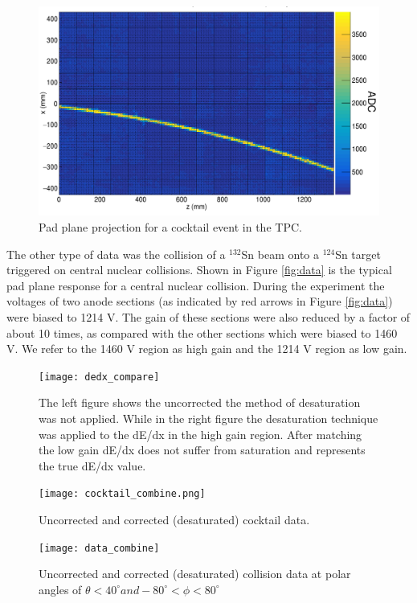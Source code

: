 \documentclass[review]{elsarticle}
\begin{document}
\begin{figure}[H]
\includegraphics[width=\linewidth]{cocktail.png}
\caption{Pad plane projection for a cocktail event in the TPC.}
\label{fig:cocktail}
\end{figure}

The other type of data was the collision of a ${}^{132}$Sn beam onto a ${}^{124}$Sn target triggered on central nuclear collisions. Shown in Figure \ref{fig:data} is the typical pad plane response for a central nuclear collision. During the experiment the voltages of two anode sections (as indicated by red arrows in Figure \ref{fig:data}) were biased to 1214 V. The gain of these sections were also reduced by a factor of about 10 times, as compared with the other sections which were biased to 1460 V. We refer to the 1460 V region as high gain and the 1214 V region as low gain. 

\begin{figure}[t]
\centering
\texttt{[image: dedx\_compare]}
\caption{The left figure shows the uncorrected the method of desaturation was not applied. While in the right figure the desaturation technique was applied to the dE/dx in the high gain region. After matching the low gain dE/dx does not suffer from saturation and represents the true dE/dx value.}
\label{fig:lowvshigh}
\end{figure}

\begin{figure}[t]
\texttt{[image: cocktail\_combine.png]}
\caption{Uncorrected and corrected (desaturated) cocktail data.}
\label{fig:cocktail_combine}
\end{figure}

\begin{figure}[t]
\texttt{[image: data\_combine]}
\caption{Uncorrected and corrected (desaturated) collision data at polar angles of $\theta < 40^{\circ} and -80^{\circ} < \phi < 80^{\circ}$}
\label{fig:data_combine}
\end{figure}
\end{document}
